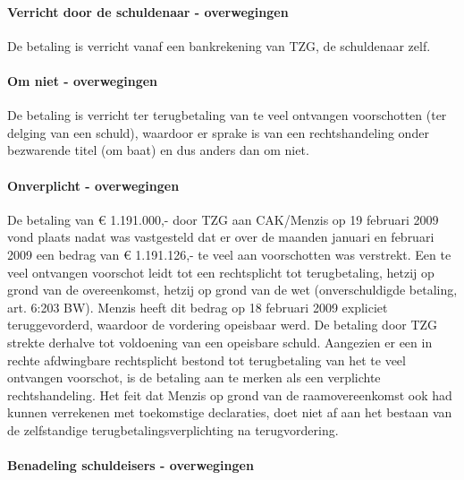 \documentclass[
  dutch,
  a4paper,
]{article}
\begin{document}
\paragraph{Verricht door de schuldenaar - overwegingen}\label{verricht-door-de-schuldenaar---overwegingen-89}

De betaling is verricht vanaf een bankrekening van TZG, de schuldenaar zelf.

\paragraph{Om niet - overwegingen}\label{om-niet---overwegingen-89}

De betaling is verricht ter terugbetaling van te veel ontvangen voorschotten (ter delging van een schuld), waardoor er sprake is van een rechtshandeling onder bezwarende titel (om baat) en dus anders dan om niet.

\paragraph{Onverplicht - overwegingen}\label{onverplicht---overwegingen-89}

De betaling van € 1.191.000,- door TZG aan CAK/Menzis op 19 februari 2009 vond plaats nadat was vastgesteld dat er over de maanden januari en februari 2009 een bedrag van € 1.191.126,- te veel aan voorschotten was verstrekt. Een te veel ontvangen voorschot leidt tot een rechtsplicht tot terugbetaling, hetzij op grond van de overeenkomst, hetzij op grond van de wet (onverschuldigde betaling, art. 6:203 BW). Menzis heeft dit bedrag op 18 februari 2009 expliciet teruggevorderd, waardoor de vordering opeisbaar werd. De betaling door TZG strekte derhalve tot voldoening van een opeisbare schuld. Aangezien er een in rechte afdwingbare rechtsplicht bestond tot terugbetaling van het te veel ontvangen voorschot, is de betaling aan te merken als een verplichte rechtshandeling. Het feit dat Menzis op grond van de raamovereenkomst ook had kunnen verrekenen met toekomstige declaraties, doet niet af aan het bestaan van de zelfstandige terugbetalingsverplichting na terugvordering.

\paragraph{Benadeling schuldeisers - overwegingen}\label{benadeling-schuldeisers---overwegingen-89}
\end{document}
